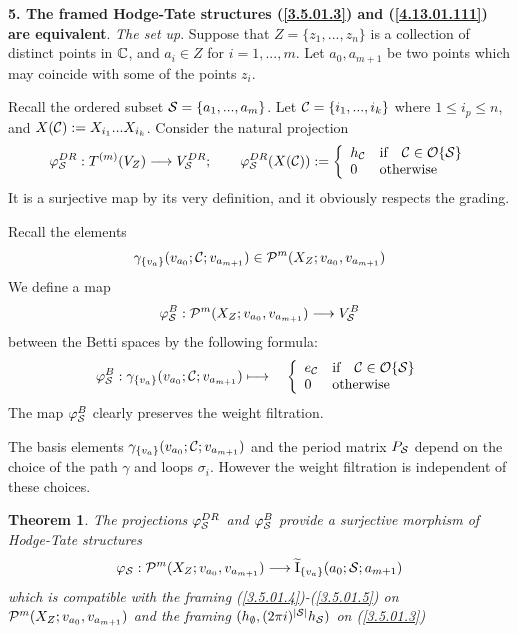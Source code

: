 \documentclass[10pt]{article}
\newtheorem{theorem}{Theorem}[section]
\begin{document}
{\bf 5. The framed Hodge-Tate structures (\ref{3.5.01.3}) and (\ref{4.13.01.111}) 
are equivalent}. 
{\it The set up}. 
Suppose that $Z = \{z_1, ..., z_n\}$ is a collection of distinct points in ${\mathbb C}$, 
and $a_i \in Z$ for $i=1, ..., m$. 
Let $a_0, a_{m+1}$ be two points which may coincide with 
some of the points $z_i$. 

Recall the ordered subset ${\cal S} = \{a_1, ..., a_m\}$. 
Let ${\cal C} = \{i_1, ..., i_k\}$ where $1 \leq i_p \leq n$, and 
$X({\cal C}):=X_{i_1} ... X_{i_k}$. 
Consider the natural projection
$$
\varphi^{DR}_{{\cal S}}: T^{(m)}(V_Z) \longrightarrow V^{DR}_{{\cal S}}; \qquad 
\varphi^{DR}_{{\cal S}}(X({\cal C})) := 
\left\{ \begin{array}{ll}
 h_{\cal C} & \mbox{if} \quad {\cal C} \in {\cal O}\{{\cal S}\}
\\
 0 & \mbox{otherwise} \end{array}\right.
$$
It is a surjective map by its very definition, and it  obviously respects the grading. 


Recall the  elements 
$$
\gamma_{\{v_a\}}(v_{a_0}; {\cal C}; v_{a_{m+1}}) \in  {\cal P}^m(X_Z; v_{a_0}, v_{a_{m+1}})
$$
  We define a map 
$$
\varphi^{B}_{{\cal S}}: {\cal P}^m(X_Z; v_{a_0}, v_{a_{m+1}}) \longrightarrow V^{B}_{{\cal S}}
$$
between the Betti spaces by the following formula:
$$
\varphi^{B}_{{\cal S}}: \gamma_{\{v_a\}}(v_{a_0}; {\cal C}; v_{a_{m+1}}) \longmapsto \quad 
\left\{ \begin{array}{ll}
 e_{\cal C} & \mbox{if} \quad {\cal C} \in {\cal O}\{{\cal S}\}
\\
 0 & \mbox{otherwise} \end{array}\right.
$$
The map $\varphi^{B}_{{\cal S}}$ clearly preserves the weight filtration. 

The basis elements $\gamma_{\{v_a\}}(v_{a_0}; {\cal C}; v_{a_{m+1}})$ and the period 
matrix $P_{\cal S}$ depend on the choice of the path $\gamma$ and loops $\sigma_i$. 
However the weight filtration is independent of these choices. 


\begin{theorem} \label{2.22.01.111} The projections  $\varphi^{DR}_{{\cal S}}$  and 
$\varphi^{B}_{{\cal S}}$ 
provide a surjective morphism of 
Hodge-Tate structures  
\begin{equation} \label{3.5.01.6}
\varphi_{{\cal S}}: {\cal P}^m(X_Z; v_{a_0}, v_{a_{m+1}}) \longrightarrow \widetilde 
{\rm I}_{\{v_a\}}(a_0; {\cal S}; a_{m+1})
\end{equation}
 which is compatible with the framing 
(\ref{3.5.01.4})-(\ref{3.5.01.5}) on ${\cal P}^m(X_Z; v_{a_0}, v_{a_{m+1}})$ and the framing 
$(h_{\emptyset}, (2\pi i)^{|{\cal S}|}h_{{\cal S}})$ on (\ref{3.5.01.3})
\end{theorem} 
\end{document}

